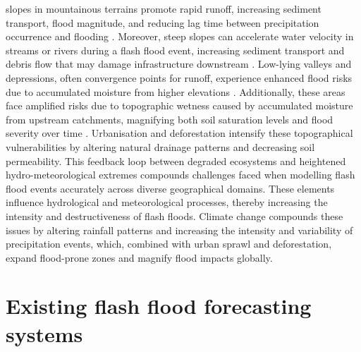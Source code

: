 slopes in mountainous terrains promote rapid runoff, increasing sediment transport, flood magnitude, and reducing lag time between precipitation occurrence and flooding \citep{Pham2020, Hinge2024}. Moreover, steep slopes can accelerate water velocity in streams or rivers during a flash flood event, increasing sediment transport and debris flow that may damage infrastructure downstream \citep{Borga2019}\citep{Flamig2020}. Low-lying valleys and depressions, often convergence points for runoff, experience enhanced flood risks due to accumulated moisture from higher elevations \citep{Luong2021}\citep{AlRawas2024}. Additionally, these areas face amplified risks due to topographic wetness caused by accumulated moisture from upstream catchments, magnifying both soil saturation levels and flood severity over time \citep{Hinge2024}\citep{Luong2021}. Urbanisation and deforestation intensify these topographical vulnerabilities by altering natural drainage patterns and decreasing soil permeability. This feedback loop between degraded ecosystems and heightened hydro-meteorological extremes compounds challenges faced when modelling flash flood events accurately across diverse geographical domains. These elements influence hydrological and meteorological processes, thereby increasing the intensity and destructiveness of flash floods. Climate change compounds these issues by altering rainfall patterns and increasing the intensity and variability of precipitation events, which, combined with urban sprawl and deforestation, expand flood-prone zones and magnify flood impacts globally.


\section{Existing flash flood forecasting systems}

